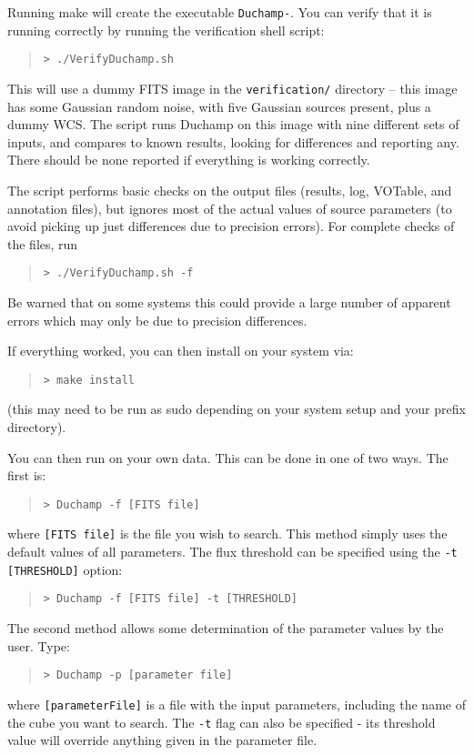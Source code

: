 
Running make will create the executable \texttt{Duchamp-{\version}}. You can
verify that it is running correctly by running the verification shell
script:
\begin{quote}
{\footnotesize
\texttt{> ./VerifyDuchamp.sh}
}
\end{quote}
This will use a dummy FITS image in the \texttt{verification/}
directory -- this image has some Gaussian random noise, with five
Gaussian sources present, plus a dummy WCS. The script runs
Duchamp on this image with nine different sets of inputs, and
compares to known results, looking for differences and reporting
any. There should be none reported if everything is working
correctly. 

The script performs basic checks on the output files (results, log,
VOTable, and annotation files), but ignores most of the actual values
of source parameters (to avoid picking up just differences due to
precision errors). For complete checks of the files, run
\begin{quote}
  {\footnotesize
    \texttt{> ./VerifyDuchamp.sh -f}
  }
\end{quote}
Be warned that on some systems this could provide a large number of
apparent errors which may only be due to precision differences.

If everything worked, you can then install \duchamp on your system via:
\begin{quote}
{\footnotesize
\texttt{> make install}
}
\end{quote}
(this may need to be run as sudo depending on your system setup and
your prefix directory).

You can then run \duchamp on your own data. This can be done in one
of two ways. The first is:
\begin{quote}
{\footnotesize
\texttt{> Duchamp -f [FITS file]}
}
\end{quote}
where \texttt{[FITS file]} is the file you wish to search. This method
simply uses the default values of all parameters. The flux threshold
can be specified using the \texttt{-t [THRESHOLD]} option:
\begin{quote}
{\footnotesize
\texttt{> Duchamp -f [FITS file] -t [THRESHOLD]}
}
\end{quote}

The second method allows some determination of the parameter values by
the user. Type:
\begin{quote}
{\footnotesize
\texttt{> Duchamp -p [parameter file]}
}
\end{quote}
where \texttt{[parameterFile]} is a file with the input parameters,
including the name of the cube you want to search. The \texttt{-t}
flag can also be specified - its threshold value will override
anything given in the parameter file.

